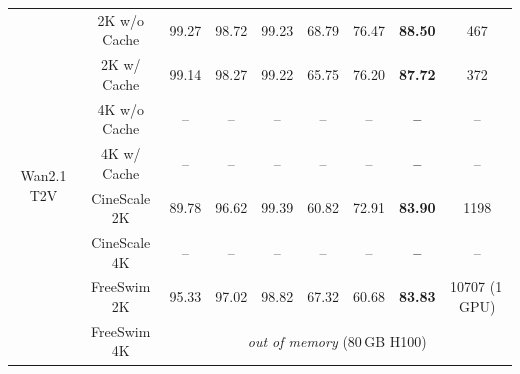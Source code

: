 \begin{table}[t]
{\begin{tabular}{c|c|cccccc|c}
    \multirow{8}{*}{Wan2.1 T2V}
      & 2K w/o Cache   & 99.27 & 98.72 & 99.23 & 68.79 & 76.47 & \cellcolor{gray!20}\textbf{88.50} & 467 \\
      & 2K w/ Cache    & 99.14 & 98.27 & 99.22 & 65.75 & 76.20 & \cellcolor{gray!20}\textbf{87.72} & 372 \\
      & 4K w/o Cache   & -- & -- & -- & -- & -- & \cellcolor{gray!20}\textbf{--} & -- \\
      & 4K w/ Cache    & -- & -- & -- & -- & -- & \cellcolor{gray!20}\textbf{--} & -- \\
    \cline{2-9}
      & CineScale 2K     & 89.78 & 96.62 & 99.39 & 60.82 & 72.91 & \cellcolor{gray!20}\textbf{83.90} & 1198 \\
      & CineScale 4K     & -- & -- & -- & -- & -- & \cellcolor{gray!20}\textbf{--} & -- \\
      & FreeSwim 2K     & 95.33 & 97.02 & 98.82 & 67.32 & 60.68 & \cellcolor{gray!20}\textbf{83.83} & 10707 (1\,GPU) \\
      & FreeSwim 4K     & \multicolumn{7}{c}{\emph{out of memory} (80\,GB H100)} \\
    \bottomrule
\end{tabular}
  }
  \vspace{-10pt}
\end{table}
